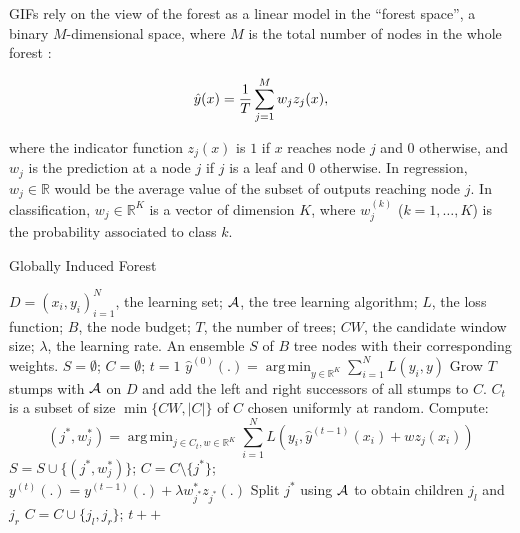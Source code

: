 \documentclass{article}
\DeclareMathOperator*{\argmin}{arg\,min}
\begin{document}
GIFs rely on the view of the forest as a linear model in the ``forest space'', 
a binary $M$-dimensional space, where $M$ is the total number of nodes in the 
whole forest \cite{l1basedcomp}:

\begin{equation}\label{eq:fs}
\vspace{-1em}
\hat{y}(x) =  \frac{1}{T} \sum_{j=1}^{M} w_j z_j(x),
\end{equation}

where the indicator function $z_j(x)$ is $1$ if $x$ reaches node $j$
and $0$ otherwise, and $w_j$ is the prediction at a node $j$ if $j$ is
a leaf and $0$ otherwise. In regression, $w_j \in \mathbb{R}$ would be the 
average value of the subset of outputs reaching node $j$. In classification, 
$w_j \in \mathbb{R}^K$ is a vector of dimension $K$, where $w_j^{(k)}$ 
($k=1,\ldots,K$) is the probability associated to class $k$.



\begin{algorithm}[tb]
   \caption{Globally Induced Forest}
   \label{alg:gif}
\begin{algorithmic}[1]
     $D= (x_i,y_i)_{i=1}^N$, the learning set; ${\cal 
    A}$, the tree learning algorithm; $L$, the loss function;  $B$, the node 
    budget; $T$, the number of trees; $CW$, the candidate window size; 
    $\lambda$, the learning rate.
     An ensemble $S$ of $B$ tree nodes with their 
    corresponding weights.
    \STATE $S=\emptyset$; $C=\emptyset$; $t=1$
    \STATE $\hat{y}^{(0)}(.)= \argmin_{y \in \mathbb{R}^K} \sum_{i=1}^{N} 
    L(y_i, y)$
    \STATE Grow $T$ stumps with ${\cal A}$ on $D$ and add the left and right 
    successors of all stumps to  $C$.    
    \REPEAT
        \STATE $C_t$ is a subset of size $\min\{CW, |C|\}$ of $C$ chosen 
        uniformly at random.
        \STATE Compute:
            \vspace{-1.5em}
            \begin{equation*}
            (j^*,w^*_j)=\argmin_{j\in C_t, w\in \mathbb{R}^K} 
            \sum_{i=1}^{N} L \left(y_i, \hat{y}^{(t-1)}(x_i) + w z_j(x_i) 
            \right)
            \end{equation*}
            \vspace{-1em}
        \STATE $S=S\cup\{(j^*,w^*_j)\}$; $C=C\setminus\{j^*\}$; \\
            $y^{(t)}(.)=y^{(t-1)}(.)+\lambda w^*_{j^*} z_{j^*}(.)$
        \STATE Split $j^*$ using ${\cal A}$ to obtain children $j_l$ and $j_r$
        \STATE $C=C\cup\{j_l,j_r\}$; $t++$
\end{algorithmic}
\end{algorithm}
\end{document}
